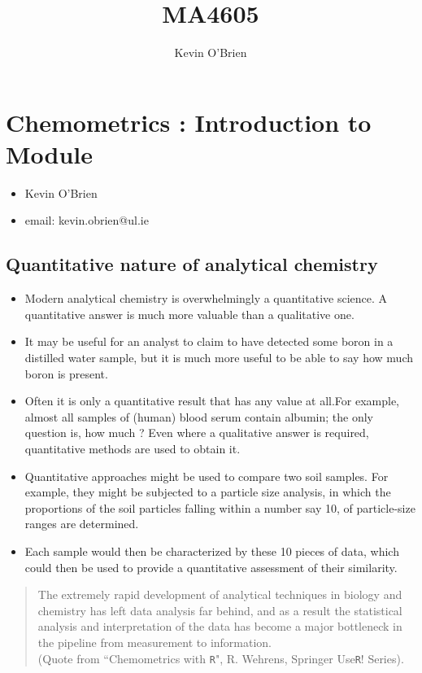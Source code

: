 \documentclass[12pt, a4paper]{article}
\begin{document}
	\author{Kevin O'Brien}
	\title{MA4605}
	
	\tableofcontents \setcounter{tocdepth}{2}
\newpage
\Large	
\section{Chemometrics : Introduction to Module}
\begin{itemize}
\item Kevin O'Brien
\item email: kevin.obrien@ul.ie
\end{itemize}
\newpage
\subsection{Quantitative nature of analytical chemistry}
\begin{itemize}
\item Modern analytical chemistry is overwhelmingly a quantitative science.
A quantitative answer is much more valuable than a qualitative one.
\item It may be useful for an analyst to claim to have detected some boron in a
distilled water sample, but it is much more useful to be able to say how
much boron is present.

\item Often it is only a quantitative result that has any value at all.For
example, almost all samples of (human) blood serum contain albumin;
the only question is, how much ? Even where a qualitative answer is required, quantitative methods are
used to obtain it.

\item Quantitative approaches might be used to compare two soil samples. For example, they might be subjected to a particle
size analysis, in which the proportions of the soil particles falling within a number say 10, of particle-size ranges are determined. 
\item Each sample would then be characterized by these 10 pieces of data, which could
then be used to provide a quantitative assessment of their similarity.
\end{itemize}
\newpage

\begin{framed}
\begin{quote}

The extremely rapid development of analytical techniques in biology and
chemistry has left data analysis far behind, and as a result the statistical
analysis and interpretation of the data has become a major bottleneck in the
pipeline from measurement to information. \\ \noindent (Quote from ``Chemometrics with \texttt{R}", R. Wehrens,  Springer Use\texttt{R}! Series).
\end{quote}
\end{framed}
\end{document}
